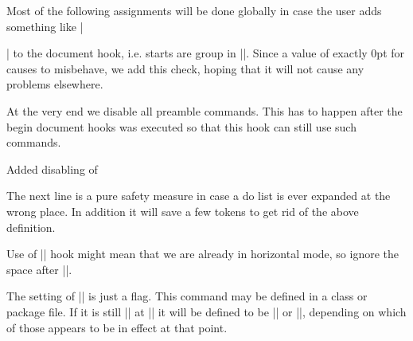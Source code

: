     Most of the following assignments will be done globally in case
    the user adds something like |\begin{multicols}| to the document
    hook, i.e. starts are group in ||.
    Since a value of exactly 0pt for  causes
     to misbehave, we add this check, hoping
    that it will not cause any problems elsewhere.
  \begin{teX}
  \ifdim\topskip<1sp\global\topskip 1sp\relax\fi
  \global\@maxdepth\maxdepth
  \global\let\@begindocumenthook\@undefined
  \ifx\@listfiles\@undefined
    \global\let\@filelist\relax
    \global\let\@addtofilelist\@gobble
  \fi
  \end{teX}

    At the very end we disable all preamble commands. This has to
    happen after the begin document hooks was executed so that this
    hook can still use such commands.


   Added disabling of 
  \begin{teX}
  \global\let \@nodocument \relax
  \end{teX}
   The next line is a pure safety measure in case a do list is ever
   expanded at the wrong place. In addition it will save a few
   tokens to get rid of the above definition.
  \begin{teX}
  \global\let\do\noexpand
  \end{teX}

    Use of |\AtBeginDocument| hook might mean that we are already in
    horizontal mode, so ignore the space after ||.
  \begin{teX}
  \ignorespaces}
  \end{teX}

  \begin{teX}
\@onlypreamble\document
  \end{teX}

 \begin{macro}{\normalsfcodes}
 The setting of |\@empty| is just a flag. This command may be defined
 in a class or package file. If it is still |\@empty| at 
 || it will be defined to be |\frenchspacing| or
 |\nonfrenchspacing|, depending on which of those appears to be in
 effect at that point.
 \end{macro}
    \begin{teX}
\let\normalsfcodes\@empty
    \end{teX}



\end{multicols}
